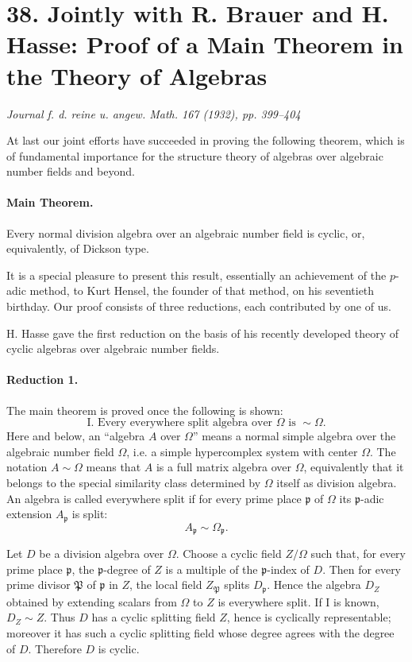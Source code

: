 \documentclass[11pt]{article}
\providecommand{\Om}{\Omega}
\begin{document}
\clearpage

\section*{38. Jointly with R. Brauer and H. Hasse: Proof of a Main Theorem in the Theory of Algebras}

\begin{center}
\emph{Journal f. d. reine u. angew. Math. 167 (1932), pp. 399--404}
\end{center}

At last our joint efforts have succeeded in proving the following theorem, which is of fundamental importance for the structure theory of algebras over algebraic number fields and beyond.

\paragraph{Main Theorem.}
Every normal division algebra over an algebraic number field is cyclic, or, equivalently, of Dickson type.

It is a special pleasure to present this result, essentially an achievement of the \(p\)-adic method, to Kurt Hensel, the founder of that method, on his seventieth birthday. Our proof consists of three reductions, each contributed by one of us.

H. Hasse gave the first reduction on the basis of his recently developed theory of cyclic algebras over algebraic number fields.

\paragraph{Reduction 1.}
The main theorem is proved once the following is shown:
\[
\text{I. Every everywhere split algebra over }\Om\text{ is } \sim\Om .
\]
Here and below, an ``algebra \(A\) over \(\Om\)'' means a normal simple algebra over the algebraic number field \(\Om\), i.e. a simple hypercomplex system with center \(\Om\). The notation \(A\sim\Om\) means that \(A\) is a full matrix algebra over \(\Om\), equivalently that it belongs to the special similarity class determined by \(\Om\) itself as division algebra. An algebra is called everywhere split if for every prime place \(\mathfrak p\) of \(\Om\) its \(\mathfrak p\)-adic extension \(A_{\mathfrak p}\) is split:
\[
        A_{\mathfrak p}\sim\Om_{\mathfrak p}.
\]

Let \(D\) be a division algebra over \(\Om\). Choose a cyclic field \(Z/\Om\) such that, for every prime place \(\mathfrak p\), the \(\mathfrak p\)-degree of \(Z\) is a multiple of the \(\mathfrak p\)-index of \(D\). Then for every prime divisor \(\mathfrak P\) of \(\mathfrak p\) in \(Z\), the local field \(Z_{\mathfrak P}\) splits \(D_{\mathfrak p}\). Hence the algebra \(D_Z\) obtained by extending scalars from \(\Om\) to \(Z\) is everywhere split. If I is known, \(D_Z\sim Z\). Thus \(D\) has a cyclic splitting field \(Z\), hence is cyclically representable; moreover it has such a cyclic splitting field whose degree agrees with the degree of \(D\). Therefore \(D\) is cyclic.
\end{document}

